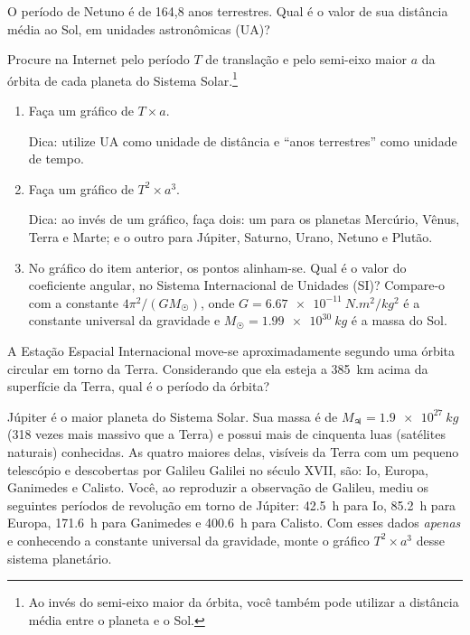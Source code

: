 \documentclass[a4paper]{article}
\begin{document}
\begin{exercicio}
 O período de Netuno é de 164,8 anos terrestres. Qual é o valor de sua distância média ao Sol, em unidades astronômicas (UA)?
\end{exercicio}

\begin{exercicio}
 Procure na Internet pelo período $T$ de translação e pelo semi-eixo maior $a$ da órbita de cada planeta do Sistema Solar.\footnote{Ao invés do semi-eixo maior da órbita, você também pode utilizar a distância média entre o planeta e o Sol.}
\begin{enumerate}
\item Faça um gráfico de $T \times a$.

{\footnotesize Dica: utilize UA como unidade de distância e ``anos terrestres'' como unidade de tempo.}

\item Faça um gráfico de $T^2 \times a^3$.

{\footnotesize Dica: ao invés de um gráfico, faça dois: um para os planetas Mercúrio, Vênus, Terra e Marte;
e o outro para Júpiter, Saturno, Urano, Netuno e Plutão.}

\item No gráfico do item anterior, os pontos alinham-se. Qual é o valor do coeficiente angular, no Sistema Internacional de Unidades (SI)?
Compare-o com a constante $4\pi^2/(GM_{\astrosun})$, onde $G = \SI{6.67e-11}{N.m^2/kg^2}$ é a constante universal da gravidade e $M_{\astrosun} = \SI{1.99e30}{kg}$ é a massa do Sol.
\end{enumerate}
\end{exercicio}

\begin{exercicio}
 A Estação Espacial Internacional move-se aproximadamente segundo uma órbita circular em torno da Terra.
Considerando que ela esteja a \SI{385}{km} acima da superfície da Terra, qual é o período da órbita?
\end{exercicio}

\begin{exercicio*}
 Júpiter é o maior planeta do Sistema Solar. Sua massa é de $M_{\jupiter}=\SI{1.9e27}{kg}$ (318 vezes mais massivo que a Terra) e possui mais de cinquenta luas (satélites naturais) conhecidas. As quatro maiores delas, visíveis da Terra com um pequeno telescópio e descobertas por Galileu Galilei no século XVII, são: Io, Europa, Ganimedes e Calisto. Você, ao reproduzir a observação de Galileu, mediu os seguintes períodos de revolução em torno de Júpiter: \SI{42.5}{h} para Io, \SI{85.2}{h} para Europa, \SI{171.6}{h} para Ganimedes e \SI{400.6}{h} para Calisto.  
Com esses dados \emph{apenas} e conhecendo a constante universal da gravidade, monte o gráfico $T^2 \times a^3$ desse sistema planetário.
\end{exercicio*}
\end{document}

